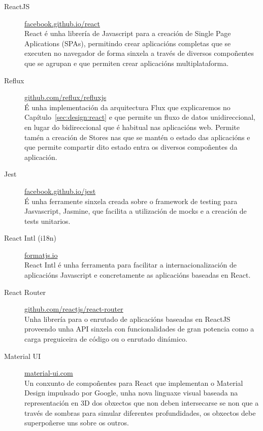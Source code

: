   \begin{description}
   \item [ReactJS] 
\href{https://facebook.github.io/react/}{facebook.github.io/react} \\ React é 
unha librería de Javascript para a 
creación de Single Page Aplications (SPAs), permitindo crear aplicacións 
completas que se executen no navegador de forma sinxela a través de diversos 
compoñentes que se agrupan e que permiten crear aplicacións multiplataforma.

   \item [Reflux] \href{https://github.com/reflux/refluxjs}{
github.com/reflux/refluxjs}\\ É unha implementación da 
arquitectura Flux que explicaremos no Capítulo~\ref{sec:design:react} e que 
permite un fluxo de datos unidireccional, en lugar do 
bidireccional que é habitual nas aplicacións web.
    Permite tamén a creación de Stores nas que se mantén o estado das aplicacións e que 
permite compartir dito estado entra os diversos compoñentes da aplicación.

   \item [Jest] 
\href{https://facebook.github.io/jest/}{facebook.github.io/jest}\\ É unha 
ferramente sinxela creada sobre o 
framework de testing para Jasvascript, Jasmine, que facilita a utilización de 
mocks e a creación de tests unitarios.

   \item [React Intl (i18n)]\href{http://formatjs.io/}{formatjs.io}\\ React 
Intl é unha 
ferramenta para facilitar a internacionalización de aplicacións Javascript e 
concretamente as 
aplicacións baseadas en React.

   \item [React 
Router]\href{https://github.com/reactjs/react-router}{
github.com/reactjs/react-router}\\ Unha 
librería para o enrutado de aplicacións baseadas en ReactJS 
proveendo unha API sinxela con funcionalidades de gran potencia como a carga preguiceira 
de código ou o enrutado dinámico.

   \item [Material UI] 
\href{http://www.material-ui.com/}{material-ui.com}\\ Un conxunto de 
compoñentes para React que implementan o Material 
Design impulsado por Google, unha nova linguaxe visual baseada na representación en 3D 
dos obxectos que non deben intersecarse se non que a través de sombras para simular 
diferentes profundidades, os obxectos debe superpoñerse uns sobre os outros.

  \end{description}

